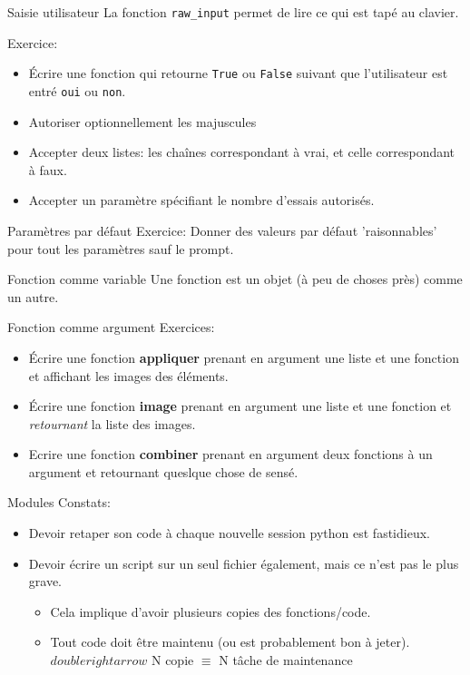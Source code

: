 \documentclass{beamer}
\begin{document}
\begin{frame}{Saisie utilisateur}
  La fonction {\tt raw\_input} permet de lire ce qui est tapé au clavier.

  Exercice:
  \begin{itemize}
  \item Écrire une fonction qui retourne {\tt True} ou {\tt False} suivant que l'utilisateur est entré {\tt oui} ou {\tt non}.
  \item Autoriser optionnellement les majuscules
  \item Accepter deux listes: les chaînes correspondant à vrai, et celle correspondant à faux.
  \item Accepter un paramètre spécifiant le nombre d'essais autorisés.
  \end{itemize}
\end{frame}

\begin{frame}{Paramètres par défaut}
  Exercice: Donner des valeurs par défaut 'raisonnables' pour tout les paramètres sauf le prompt.
\end{frame}

\begin{frame}[fragile]{Fonction comme variable}
  Une fonction est un objet (à peu de choses près) comme un autre.
  \fbox{}
\end{frame}

\begin{frame}[fragile]{Fonction comme argument}
  Exercices:
  \begin{itemize}
  \item Écrire une fonction {\bf appliquer} prenant en argument une liste et une fonction et affichant les images des éléments.
  \item Écrire une fonction {\bf image} prenant en argument une liste et une fonction et {\em retournant} la liste des images.
  \item Ecrire une fonction {\bf combiner} prenant en argument deux fonctions à un argument et retournant queslque chose de sensé.
  \end{itemize}
\end{frame}

\begin{frame}[fragile]{Modules}
  Constats:
  \begin{itemize}
  \item Devoir retaper son code à chaque nouvelle session python est fastidieux.
  \item Devoir écrire un script sur un seul fichier également, mais ce n'est pas le plus grave.
    \begin{itemize}
    \item Cela implique d'avoir plusieurs copies des fonctions/code.
    \item Tout code doit être maintenu (ou est probablement bon à jeter). \linebreak
      $doublerightarrow$ N copie $\equiv$ N tâche de maintenance
    \end{itemize}
  \end{itemize}
\end{frame}
\end{document}
